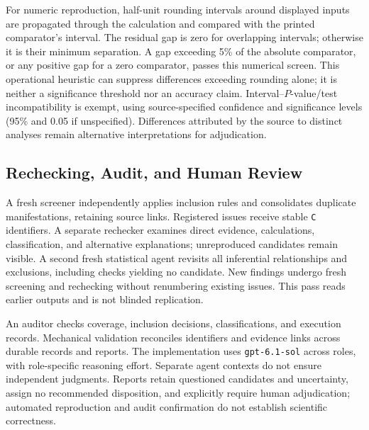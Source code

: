 For numeric reproduction, half-unit rounding intervals around displayed inputs are propagated through the calculation and compared with the printed comparator's interval. The residual gap is zero for overlapping intervals; otherwise it is their minimum separation. A gap exceeding 5\% of the absolute comparator, or any positive gap for a zero comparator, passes this numerical screen. This operational heuristic can suppress differences exceeding rounding alone; it is neither a significance threshold nor an accuracy claim. Interval--\(P\)-value/test incompatibility is exempt, using source-specified confidence and significance levels (95\% and 0.05 if unspecified). Differences attributed by the source to distinct analyses remain alternative interpretations for adjudication.

\subsection{Rechecking, Audit, and Human Review}
\label{sec:framework-audit}
\label{sec:framework-report}

A fresh screener independently applies inclusion rules and consolidates duplicate manifestations, retaining source links. Registered issues receive stable \texttt{C} identifiers. A separate rechecker examines direct evidence, calculations, classification, and alternative explanations; unreproduced candidates remain visible. A second fresh statistical agent revisits all inferential relationships and exclusions, including checks yielding no candidate. New findings undergo fresh screening and rechecking without renumbering existing issues. This pass reads earlier outputs and is not blinded replication.

An auditor checks coverage, inclusion decisions, classifications, and execution records. Mechanical validation reconciles identifiers and evidence links across durable records and reports. The implementation uses \texttt{gpt-6.1-sol} across roles, with role-specific reasoning effort. Separate agent contexts do not ensure independent judgments. Reports retain questioned candidates and uncertainty, assign no recommended disposition, and explicitly require human adjudication; automated reproduction and audit confirmation do not establish scientific correctness.
